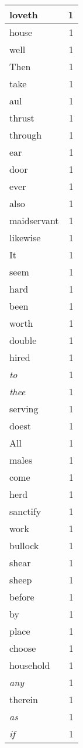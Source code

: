 \begin{center}
\begin{longtable}{l|r}
loveth & 1 \\ \hline
house & 1 \\ \hline
well & 1 \\ \hline
Then & 1 \\ \hline
take & 1 \\ \hline
aul & 1 \\ \hline
thrust & 1 \\ \hline
through & 1 \\ \hline
ear & 1 \\ \hline
door & 1 \\ \hline
ever & 1 \\ \hline
also & 1 \\ \hline
maidservant & 1 \\ \hline
likewise & 1 \\ \hline
It & 1 \\ \hline
seem & 1 \\ \hline
hard & 1 \\ \hline
been & 1 \\ \hline
worth & 1 \\ \hline
double & 1 \\ \hline
hired & 1 \\ \hline
\emph{to} & 1 \\ \hline
\emph{thee} & 1 \\ \hline
serving & 1 \\ \hline
doest & 1 \\ \hline
All & 1 \\ \hline
males & 1 \\ \hline
come & 1 \\ \hline
herd & 1 \\ \hline
sanctify & 1 \\ \hline
work & 1 \\ \hline
bullock & 1 \\ \hline
shear & 1 \\ \hline
sheep & 1 \\ \hline
before & 1 \\ \hline
by & 1 \\ \hline
place & 1 \\ \hline
choose & 1 \\ \hline
household & 1 \\ \hline
\emph{any} & 1 \\ \hline
therein & 1 \\ \hline
\emph{as} & 1 \\ \hline
\emph{if} & 1 \\ \hline

\end{longtable}
\end{center}
